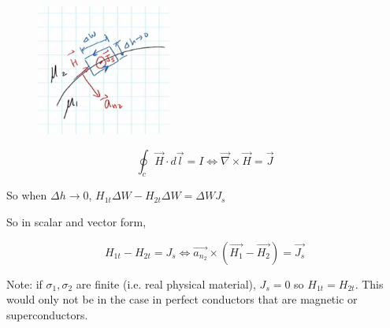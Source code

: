 \documentclass[10pt]{article}
\begin{document}
\begin{figure}[H]
	\centering
	\includegraphics[width=0.6\linewidth]{img/image_2022-04-12-01-42-24.png}
	\caption{}
	\label{fig:}
\end{figure}


\begin{equation}
	\oint_c \vec{H} \cdot  d \vec{l} = I \Leftrightarrow \vec{\nabla} \times  \vec{H} = \vec{J}
\end{equation}

So when $ \Delta h \to 0 $, $ H_{1t} \Delta W - H_{2t} \Delta W = \Delta W J_s $ 


So in scalar and vector form,

\begin{equation}
	H_{1t} - H_{2t} = J_s \Leftrightarrow \vec{a_{n_2}} \times  (\vec{H_1} - \vec{H_2}) = \vec{J_s}
\end{equation}

Note: if $ \sigma_1, \sigma_2 $ are finite (i.e. real physical material), $ J_s = 0 $ so  $ H_{1t} = H_{2t}$. 
This would only not be in the case in perfect conductors that are magnetic or superconductors.
\end{document}

